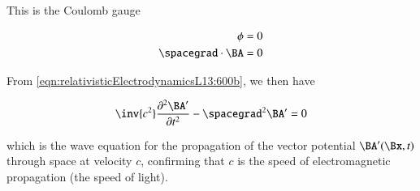 This is the Coulomb gauge

\begin{align}\label{eqn:relativisticElectrodynamicsL13:570}
\phi &= 0 \\
\spacegrad \cdot \BA &= 0
\end{align}

From \ref{eqn:relativisticElectrodynamicsL13:600b}, we then have

\begin{equation}\label{eqn:relativisticElectrodynamicsL13:610}
\inv{c^2} \frac{\partial^2 \BA'}{\partial t^2} -\spacegrad^2 \BA' = 0
\end{equation}

which is the wave equation for the propagation of the vector potential $\BA'(\Bx, t)$ through space at velocity $c$, confirming that $c$ is the speed of electromagnetic propagation (the speed of light).

\EndArticle
